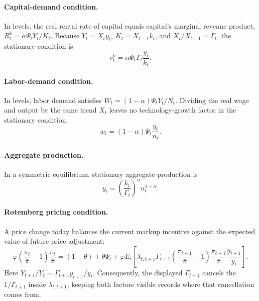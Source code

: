 \documentclass[12pt,final]{article}
\begin{document}
\paragraph{Capital-demand condition.}
In levels, the real rental rate of capital equals capital's marginal revenue
product, $R_t^k=\alpha\Psi_tY_t/K_t$.  Because
$Y_t=X_ty_t$, $K_t=X_{t-1}k_t$, and $X_t/X_{t-1}=\Gamma_t$, the stationary
condition is
\begin{equation}
  r_t^k=\alpha\Psi_t\Gamma_t\frac{y_t}{k_t}.
  \label{eq:capital-foc}
\end{equation}

\paragraph{Labor-demand condition.}
In levels, labor demand satisfies
$W_t=(1-\alpha)\Psi_tY_t/N_t$.  Dividing the real wage and output by the same
trend $X_t$ leaves no technology-growth factor in the stationary condition:
\begin{equation}
  w_t=(1-\alpha)\Psi_t\frac{y_t}{n_t}.
  \label{eq:firm-labor-foc}
\end{equation}

\paragraph{Aggregate production.}
In a symmetric equilibrium, stationary aggregate production is
\begin{equation}
  y_t=\left(\frac{k_t}{\Gamma_t}\right)^{\alpha}n_t^{1-\alpha}.
  \label{eq:production-block}
\end{equation}

\paragraph{Rotemberg pricing condition.}
A price change today balances the current markup incentive against the expected value of future price adjustment:
\begin{equation}
  \varphi
  \left(\frac{\pi_t}{\bar\pi}-1\right)
  \frac{\pi_t}{\bar\pi}
  =(1-\theta)+\theta\Psi_t
  +\varphi E_t\left[
    \lambda_{t,t+1}\Gamma_{t+1}
    \left(\frac{\pi_{t+1}}{\bar\pi}-1\right)
    \frac{\pi_{t+1}}{\bar\pi}
    \frac{y_{t+1}}{y_t}
    \right].
  \label{eq:pricing-foc}
\end{equation}
Here $Y_{t+1}/Y_t=\Gamma_{t+1}y_{t+1}/y_t$.  Consequently, the displayed
$\Gamma_{t+1}$ cancels the $1/\Gamma_{t+1}$ inside
$\lambda_{t,t+1}$; keeping both factors visible records where that cancellation
comes from.
\end{document}
